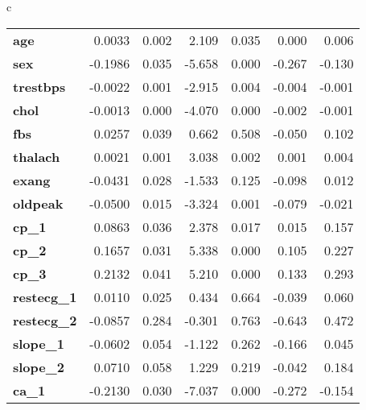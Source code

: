 \begin{table*}[!tp]
{{\begin{tabular}{c}
\begin{tabular*}{\textwidth}{l @{\extracolsep{\fill}} rrrrrr}
\textbf{age}        &       0.0033   &        0.002     &     2.109  &         0.035        &        0.000    &        0.006     \\
\textbf{sex}        &      -0.1986   &        0.035     &    -5.658  &         0.000        &       -0.267    &       -0.130     \\
\textbf{trestbps}   &      -0.0022   &        0.001     &    -2.915  &         0.004        &       -0.004    &       -0.001     \\
\textbf{chol}       &      -0.0013   &        0.000     &    -4.070  &         0.000        &       -0.002    &       -0.001     \\
\textbf{fbs}        &       0.0257   &        0.039     &     0.662  &         0.508        &       -0.050    &        0.102     \\
\textbf{thalach}    &       0.0021   &        0.001     &     3.038  &         0.002        &        0.001    &        0.004     \\
\textbf{exang}      &      -0.0431   &        0.028     &    -1.533  &         0.125        &       -0.098    &        0.012     \\
\textbf{oldpeak}    &      -0.0500   &        0.015     &    -3.324  &         0.001        &       -0.079    &       -0.021     \\
\textbf{cp\_1}      &       0.0863   &        0.036     &     2.378  &         0.017        &        0.015    &        0.157     \\
\textbf{cp\_2}      &       0.1657   &        0.031     &     5.338  &         0.000        &        0.105    &        0.227     \\
\textbf{cp\_3}      &       0.2132   &        0.041     &     5.210  &         0.000        &        0.133    &        0.293     \\
\textbf{restecg\_1} &       0.0110   &        0.025     &     0.434  &         0.664        &       -0.039    &        0.060     \\
\textbf{restecg\_2} &      -0.0857   &        0.284     &    -0.301  &         0.763        &       -0.643    &        0.472     \\
\textbf{slope\_1}   &      -0.0602   &        0.054     &    -1.122  &         0.262        &       -0.166    &        0.045     \\
\textbf{slope\_2}   &       0.0710   &        0.058     &     1.229  &         0.219        &       -0.042    &        0.184     \\
\textbf{ca\_1}      &      -0.2130   &        0.030     &    -7.037  &         0.000        &       -0.272    &       -0.154     \\

\end{tabular*}
\end{tabular}}}
\end{table*}

